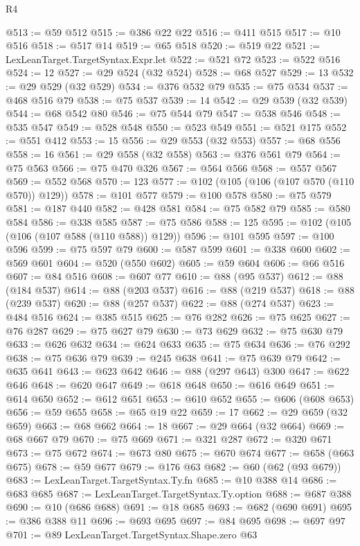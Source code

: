 \begin{lexlean}{R4}
\begin{coremodule}
@513 := @59 @512
@515 := @386 @22 @22
@516 := @411 @515
@517 := @10 @516
@518 := @517 @14
@519 := @65 @518
@520 := @519 @22
@521 := LexLeanTarget.TargetSyntax.Expr.let
@522 := @521 @72
@523 := @522 @516
@524 := 12
@527 := @29 @524 (@32 @524)
@528 := @68 @527
@529 := 13
@532 := @29 @529 (@32 @529)
@534 := @376 @532 @79
@535 := @75 @534
@537 := @468 @516 @79
@538 := @75 @537
@539 := 14
@542 := @29 @539 (@32 @539)
@544 := @68 @542 @80
@546 := @75 @544 @79
@547 := @538 @546
@548 := @535 @547
@549 := @528 @548
@550 := @523 @549
@551 := @521 @175
@552 := @551 @412
@553 := 15
@556 := @29 @553 (@32 @553)
@557 := @68 @556
@558 := 16
@561 := @29 @558 (@32 @558)
@563 := @376 @561 @79
@564 := @75 @563
@566 := @75 @470 @326
@567 := @564 @566
@568 := @557 @567
@569 := @552 @568
@570 := 123
@577 := @102 (@105 (@106 (@107 @570 (@110 @570)) @129))
@578 := @101 @577
@579 := @100 @578
@580 := @75 @579
@581 := @187 @440
@582 := @428 @581
@584 := @75 @582 @79
@585 := @580 @584
@586 := @338 @585
@587 := @75 @586
@588 := 125
@595 := @102 (@105 (@106 (@107 @588 (@110 @588)) @129))
@596 := @101 @595
@597 := @100 @596
@599 := @75 @597 @79
@600 := @587 @599
@601 := @338 @600
@602 := @569 @601
@604 := @520 (@550 @602)
@605 := @59 @604
@606 := @66 @516
@607 := @84 @516
@608 := @607 @77
@610 := @88 (@95 @537)
@612 := @88 (@184 @537)
@614 := @88 (@203 @537)
@616 := @88 (@219 @537)
@618 := @88 (@239 @537)
@620 := @88 (@257 @537)
@622 := @88 (@274 @537)
@623 := @484 @516
@624 := @385 @515
@625 := @76 @282
@626 := @75 @625
@627 := @76 @287
@629 := @75 @627 @79
@630 := @73 @629
@632 := @75 @630 @79
@633 := @626 @632
@634 := @624 @633
@635 := @75 @634
@636 := @76 @292
@638 := @75 @636 @79
@639 := @245 @638
@641 := @75 @639 @79
@642 := @635 @641
@643 := @623 @642
@646 := @88 (@297 @643) @300
@647 := @622 @646
@648 := @620 @647
@649 := @618 @648
@650 := @616 @649
@651 := @614 @650
@652 := @612 @651
@653 := @610 @652
@655 := @606 (@608 @653)
@656 := @59 @655
@658 := @65 @19 @22
@659 := 17
@662 := @29 @659 (@32 @659)
@663 := @68 @662
@664 := 18
@667 := @29 @664 (@32 @664)
@669 := @68 @667 @79
@670 := @75 @669
@671 := @321 @287
@672 := @320 @671
@673 := @75 @672
@674 := @673 @80
@675 := @670 @674
@677 := @658 (@663 @675)
@678 := @59 @677
@679 := @176 @63
@682 := @60 (@62 (@93 @679))
@683 := LexLeanTarget.TargetSyntax.Ty.fn
@685 := @10 @388 @14
@686 := @683 @685
@687 := LexLeanTarget.TargetSyntax.Ty.option
@688 := @687 @388
@690 := @10 (@686 @688)
@691 := @18 @685
@693 := @682 (@690 @691)
@695 := @386 @388 @11
@696 := @693 @695
@697 := @84 @695
@698 := @697 @97
@701 := @89 LexLeanTarget.TargetSyntax.Shape.zero @63

\end{coremodule}
\end{lexlean}

